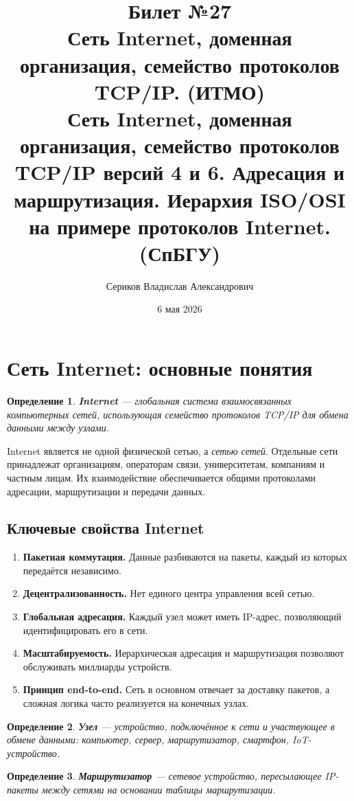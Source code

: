 \documentclass[12pt,a4paper]{article}
\title{Билет №27 \\ \small Сеть Internet, доменная организация, семейство протоколов TCP/IP. (ИТМО) \\ Сеть Internet, доменная организация, семейство протоколов TCP/IP версий 4 и 6. Адресация и маршрутизация. Иерархия ISO/OSI на примере протоколов Internet. (СпБГУ)}
\author{Сериков Владислав Александрович}
\date{6 мая 2026}
\newtheorem{definition}{Определение}
\begin{document}
\maketitle
\tableofcontents
\newpage

\section{Сеть Internet: основные понятия}

\begin{definition}
\textbf{Internet} --- глобальная система взаимосвязанных компьютерных сетей, использующая семейство протоколов TCP/IP для обмена данными между узлами.
\end{definition}

Internet является не одной физической сетью, а \emph{сетью сетей}. Отдельные сети принадлежат организациям, операторам связи, университетам, компаниям и частным лицам. Их взаимодействие обеспечивается общими протоколами адресации, маршрутизации и передачи данных.

\subsection{Ключевые свойства Internet}

\begin{enumerate}
    \item \textbf{Пакетная коммутация.} Данные разбиваются на пакеты, каждый из которых передаётся независимо.
    \item \textbf{Децентрализованность.} Нет единого центра управления всей сетью.
    \item \textbf{Глобальная адресация.} Каждый узел может иметь IP-адрес, позволяющий идентифицировать его в сети.
    \item \textbf{Масштабируемость.} Иерархическая адресация и маршрутизация позволяют обслуживать миллиарды устройств.
    \item \textbf{Принцип end-to-end.} Сеть в основном отвечает за доставку пакетов, а сложная логика часто реализуется на конечных узлах.
\end{enumerate}

\begin{definition}
\textbf{Узел} --- устройство, подключённое к сети и участвующее в обмене данными: компьютер, сервер, маршрутизатор, смартфон, IoT-устройство.
\end{definition}

\begin{definition}
\textbf{Маршрутизатор} --- сетевое устройство, пересылающее IP-пакеты между сетями на основании таблицы маршрутизации.
\end{definition}
\end{document}
